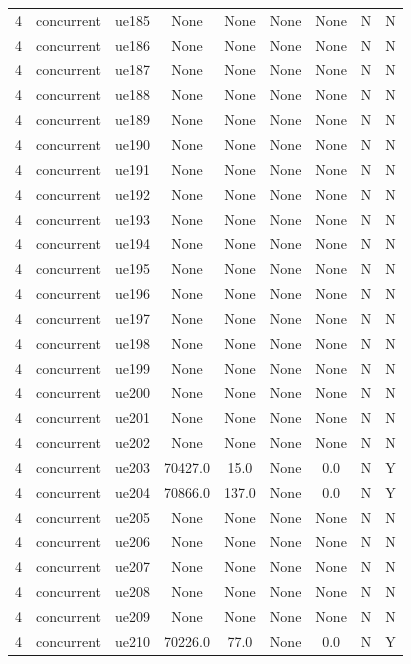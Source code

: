 \begin{table}[ht]
\begin{tabular}{|c|c|c|c|c|c|c|c|c|}
4 & concurrent & ue185 & None & None & None & None & N & N \\
4 & concurrent & ue186 & None & None & None & None & N & N \\
4 & concurrent & ue187 & None & None & None & None & N & N \\
4 & concurrent & ue188 & None & None & None & None & N & N \\
4 & concurrent & ue189 & None & None & None & None & N & N \\
4 & concurrent & ue190 & None & None & None & None & N & N \\
4 & concurrent & ue191 & None & None & None & None & N & N \\
4 & concurrent & ue192 & None & None & None & None & N & N \\
4 & concurrent & ue193 & None & None & None & None & N & N \\
4 & concurrent & ue194 & None & None & None & None & N & N \\
4 & concurrent & ue195 & None & None & None & None & N & N \\
4 & concurrent & ue196 & None & None & None & None & N & N \\
4 & concurrent & ue197 & None & None & None & None & N & N \\
4 & concurrent & ue198 & None & None & None & None & N & N \\
4 & concurrent & ue199 & None & None & None & None & N & N \\
4 & concurrent & ue200 & None & None & None & None & N & N \\
4 & concurrent & ue201 & None & None & None & None & N & N \\
4 & concurrent & ue202 & None & None & None & None & N & N \\
4 & concurrent & ue203 & 70427.0 & 15.0 & None & 0.0 & N & Y \\
4 & concurrent & ue204 & 70866.0 & 137.0 & None & 0.0 & N & Y \\
4 & concurrent & ue205 & None & None & None & None & N & N \\
4 & concurrent & ue206 & None & None & None & None & N & N \\
4 & concurrent & ue207 & None & None & None & None & N & N \\
4 & concurrent & ue208 & None & None & None & None & N & N \\
4 & concurrent & ue209 & None & None & None & None & N & N \\
4 & concurrent & ue210 & 70226.0 & 77.0 & None & 0.0 & N & Y \\

\end{tabular}
\end{table}

